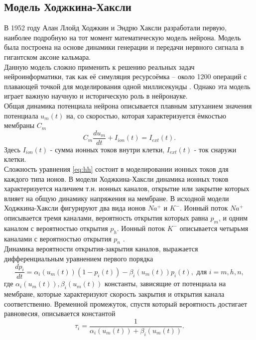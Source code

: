 \documentclass[a4paper,10pt]{article}
\begin{document}
\subsection{Модель Ходжкина-Хаксли}
	В 1952 году Алан Ллойд Ходжкин и Эндрю Хаксли разработали первую, наиболее подробную на тот момент математическую модель нейрона. Модель была построена на основе динамики генерации и передачи нервного сигнала в гигантском аксоне кальмара.\\
	\indent Данную модель сложно применить к решению реальных задач нейроинформатики, так как её симуляция ресурсоёмка -- около 1200 операций с плавающей точкой для моделирования одной миллисекунды \cite{BohteReview}. Однако эта модель играет важную научную и историческую роль в нейронауке.\\
	\indent Общая динамика потенциала нейрона описывается плавным затуханием значения потенциала $u_{m}(t)$ на, со скоростью, которая характеризуется ёмкостью мембраны $C_{m}$
	\begin{equation}\label{eq:hh}
	C_{m}\frac{du_{m}}{dt}+I_{ion}(t)=I_{ext}(t).
	\end{equation}	 
	Здесь $I_{ion}(t)$ - сумма ионных токов внутри клетки, $I_{ext}(t)$ - ток снаружи клетки.\\
	\indent Сложность уравнения \eqref{eq:hh} состоит в моделировании ионных токов для каждого типа ионов. В модели Ходжкина-Хаксли динамика ионных токов характеризуется наличием т.н. ионных каналов, открытие или закрытие которых влияет на общую динамику напряжения на мембране. В исходной модели Ходжкина-Хаксли фигурируют два вида ионов $Na^{+}$ и $K^{-}$. Ионный поток $Na^{+}$ описывается тремя каналами, вероятность открытия которых равна $p_{m}$, и одним каналом с вероятностью открытия $p_{h}$. Ионный поток $K^{-}$ описывается четырьмя каналами с вероятностью открытия $p_{n}$ \cite{Genesis}.\\ 
	\indent Динамика вероятности открытия-закрытия каналов, выражается дифференциальным уравнением первого порядка
	\begin{equation}\label{eq:hh_pch}
	\frac{dp_{i}}{dt} = \alpha_{i}(u_{m}(t))(1-p_{i}(t)) - \beta_{i}(u_{m}(t))p_{i}(t), \mbox{ для } i = m, h, n,
	\end{equation}	 
	где $\alpha_{i}(u_{m}(t)), \beta_{i}(u_{m}(t))$ константы, зависящие от потенциала на мембране, которые характеризуют скорость закрытия и открытия канала соответственно. Временной промежуток, спустя который вероятность достигает равновесия, описывается константой
	\begin{equation*}
	\tau_{i}=\frac{1}{\alpha_{i}(u_{m}(t))+\beta_{i}(u_{m}(t))}.	
	\end{equation*}
\end{document}
